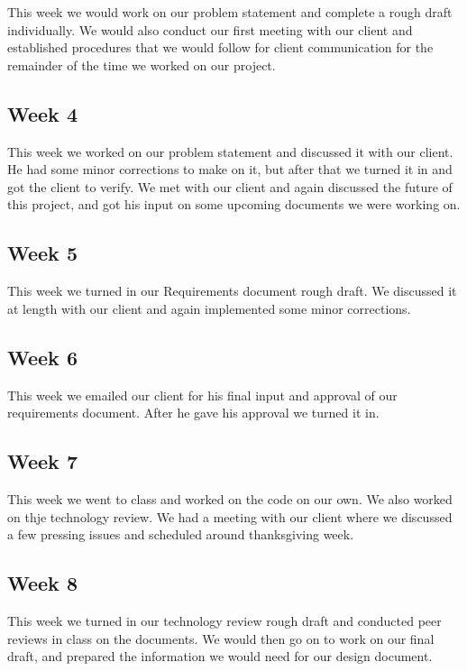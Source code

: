 \documentclass[onecolumn, draftclsnofoot,10pt, compsoc]{IEEEtran}
\begin{document}
This week we would work on our problem statement and complete a rough draft individually. We would also conduct our first meeting with our client and established procedures that we would follow for client communication for the remainder of the time we worked on our project.

\subsection{Week 4}

This week we worked on our problem statement and discussed it with our client. He had some minor corrections to make on it, but after that we turned it in and got the client to verify. We met with our client and again discussed the future of this project, and got his input on some upcoming documents we were working on.

\subsection{Week 5}

This week we turned in our Requirements document rough draft. We discussed it at length with our client and again implemented some minor corrections.

\subsection{Week 6}

This week we emailed our client for his final input and approval of our requirements document. After he gave his approval we turned it in.

\subsection{Week 7}

This week we went to class and worked on the code on our own. We also worked on thje technology review. We had a meeting with our client where we discussed a few pressing issues and scheduled around thanksgiving week.

\subsection{Week 8}

This week we turned in our technology review rough draft and conducted peer reviews in class on the documents. We would then go on to work on our final draft, and prepared the information we would need for our design document.
\end{document}
